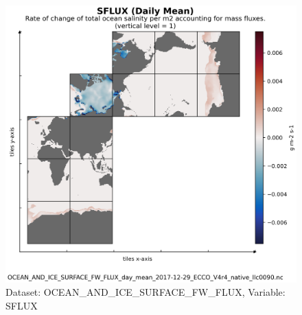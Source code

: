 \begin{figure}[H]
\centering
\includegraphics[scale=0.55]{../images/plots/v4r4/native_plots/Ocean_and_Sea-Ice_Surface_Freshwater_Fluxes/SFLUX.png}
\caption{Dataset: OCEAN\_AND\_ICE\_SURFACE\_FW\_FLUX, Variable: SFLUX}
\label{tab:table-OCEAN_AND_ICE_SURFACE_FW_FLUX_SFLUX-Plot}
\end{figure}
\newpage
\pagebreak
